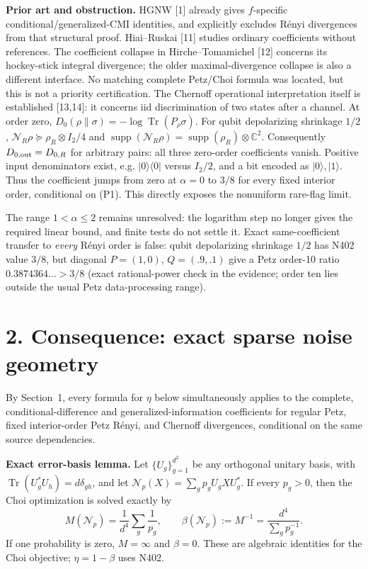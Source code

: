 \documentclass[10pt,a4paper]{article}
\newcommand{\Tr}{\operatorname{Tr}}
\newcommand{\supp}{\operatorname{supp}}
\newcommand{\N}{\mathcal N}
\begin{document}
\textbf{Prior art and obstruction.} HGNW [1] already gives $f$-specific conditional/generalized-CMI identities, and explicitly excludes R\'enyi divergences from that structural proof. Hiai--Ruskai [11] studies ordinary coefficients without references. The coefficient collapse in Hirche--Tomamichel [12] concerns its hockey-stick integral divergence; the older maximal-divergence collapse is also a different interface. No matching complete Petz/Choi formula was located, but this is not a priority certification. The Chernoff operational interpretation itself is established [13,14]: it concerns iid discrimination of two states after a channel. At order zero, $D_0(\rho\|\sigma)=-\log\Tr(P_\rho\sigma)$. For qubit depolarizing shrinkage $1/2$,
$\N_R\rho\succeq\rho_R\otimes I_2/4$ and
$\supp(\N_R\rho)=\supp(\rho_R)\otimes\mathbb C^2$.
Consequently $D_{0,\rm out}=D_{0,R}$ for arbitrary pairs: all three zero-order coefficients vanish. Positive input denominators exist, e.g. $|0\rangle\langle0|$ versus $I_2/2$, and a bit encoded as $|0\rangle,|1\rangle$. Thus the coefficient jumps from zero at $\alpha=0$ to $3/8$ for every fixed interior order, conditional on (P1). This directly exposes the nonuniform rare-flag limit.

The range $1<\alpha\le2$ remains unresolved: the logarithm step no longer gives the required linear bound, and finite tests do not settle it. Exact same-coefficient transfer to \emph{every} R\'enyi order is false: qubit depolarizing shrinkage $1/2$ has N402 value $3/8$, but diagonal $P=(1,0)$, $Q=(.9,.1)$ give a Petz order-10 ratio $0.3874364\ldots>3/8$ (exact rational-power check in the evidence; order ten lies outside the usual Petz data-processing range).


\section*{2. Consequence: exact sparse noise geometry}

By Section~1, every formula for $\eta$ below simultaneously applies to the complete, conditional-difference and generalized-information coefficients for regular Petz, fixed interior-order Petz R\'enyi, and Chernoff divergences, conditional on the same source dependencies.

\textbf{Exact error-basis lemma.} Let $\{U_g\}_{g=1}^{d^2}$ be any orthogonal unitary basis, with $\Tr(U_g^*U_h)=d\delta_{gh}$, and let $\N_p(X)=\sum_g p_gU_gXU_g^*$. If every $p_g>0$, then the Choi optimization is solved exactly by
\[
 \boxed{\ M(\N_p)=\frac{1}{d^4}\sum_g\frac1{p_g},\qquad
 \beta(\N_p):=M^{-1}=\frac{d^4}{\sum_g p_g^{-1}}.\ }
 \tag{1}
\]
If one probability is zero, $M=\infty$ and $\beta=0$. These are algebraic identities for the Choi objective; $\eta=1-\beta$ uses N402.
\end{document}

